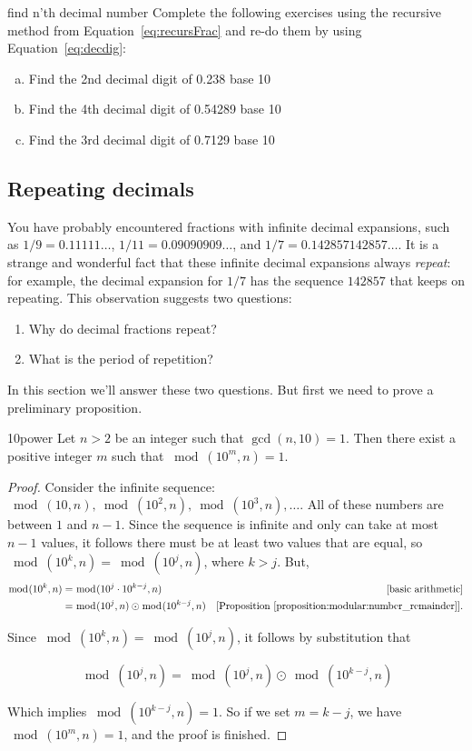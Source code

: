 \begin{exercise} {find n'th decimal number}
Complete the following exercises using the recursive method from Equation~\eqref{eq:recursFrac} and re-do them by using Equation~\eqref{eq:decdig}:
\begin{enumerate}[(a)]
\item Find the 2nd decimal digit of 0.238 base 10
\item Find the 4th decimal digit of 0.54289 base 10
\item Find the 3rd decimal digit of 0.7129 base 10

\end{enumerate}
\end{exercise}


\subsection{Repeating decimals}
You have probably encountered  fractions with infinite decimal expansions, such as $1/9 = 0.11111\ldots$, $1/11 = 0.09090909\ldots$, and $1/7 = 0.142857142857\ldots$. It is a strange and wonderful fact that these infinite decimal expansions always \emph{repeat}: for example, the decimal expansion for $1/7$ has the sequence $142857$ that keeps on repeating. This observation suggests two questions:
\begin{enumerate}
\item Why do decimal fractions repeat?
\item What is the period of repetition?
\end{enumerate}

In this section we'll answer these two questions. But first we need to prove a preliminary proposition.

\begin{prop}{10power}
Let $n>2$ be an integer such that $\gcd(n,10)=1$. Then there exist a positive integer $m$ such that $\bmod(10^{m},n)=1$.
\end{prop}

\begin{proof}
Consider the infinite sequence: $\bmod(10,n), \bmod(10^{2},n), \bmod(10^{3},n),\dots$. All of these numbers are between $1$ and $n-1$. Since the sequence is infinite and only can take at most $n-1$ values, it follows there must be at least two values that are equal, so $\bmod(10^{k},n)=\bmod(10^{j},n)$, where $k>j$. But,
\begin{align*}
\bmod(10^{k},n)&=\bmod(10^{j}\cdot 10^{k-j},n) & \text{[basic arithmetic]}\\
&=\bmod(10^{j},n)\odot \bmod(10^{k-j},n) &\text{[Proposition~\ref{proposition:modular:number_remainder}]}.
\end{align*}

Since $\bmod(10^{k},n)=\bmod(10^{j},n)$, it follows by substitution that

\begin{equation*}
\bmod(10^{j},n)=\bmod(10^j,n)\odot \bmod(10^{k-j},n)
\end{equation*}

Which implies $\bmod(10^{k-j},n)=1$.
So if we set $m=k-j$, we have $\bmod(10^{m},n)=1$, and the proof is finished.
\end{proof}

